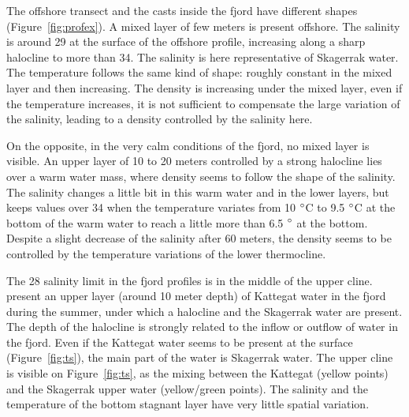 \documentclass[12pt,a4paper]{article}
\begin{document}
The offshore transect and the casts inside the fjord have different shapes
(Figure~\ref{fig:profex}).
A mixed layer of few meters is present offshore.
The salinity is around 29 at the surface of the offshore profile, increasing
along a sharp halocline to more than 34. The salinity is here representative
of Skagerrak water.
The temperature follows the same kind of shape: roughly constant
in the mixed layer and then increasing.
The density is increasing under the mixed layer, even if the temperature
increases, it is not sufficient to compensate the large variation
of the salinity, leading to a density controlled by the salinity here.

On the opposite, in the very calm
conditions of the fjord, no mixed layer is visible.
An upper layer of 10 to 20 meters controlled by a strong halocline
lies over a warm water mass, where density seems to follow the shape of
the salinity. The salinity changes a little bit in this warm water and in the lower layers,
but keeps values over 34 when the temperature variates from 10 $^{\circ}$C
to 9.5 $^{\circ}$C at the bottom of the warm water to reach a little
more than 6.5 $^{\circ}$ at the bottom.
Despite a slight decrease of the salinity after 60 meters, the density
seems to be controlled by the temperature variations of the lower thermocline.

The 28 salinity limit in the fjord profiles is in the middle
of the upper cline. \cite{arneborg2003} present an upper layer (around 10 meter
depth) of Kattegat water in the fjord during the summer, under which a halocline
and the Skagerrak water are present. The depth of the halocline is strongly related
to the inflow or outflow of water in the fjord.
Even if the Kattegat water seems to be present at the surface (Figure~\ref{fig:ts}),
the main part of the water is Skagerrak water. The upper cline
is visible on Figure~\ref{fig:ts}, as the mixing between the Kattegat (yellow points)
and the Skagerrak upper water (yellow/green points).
The salinity and the temperature of the bottom stagnant layer
have very little spatial variation.
\end{document}
